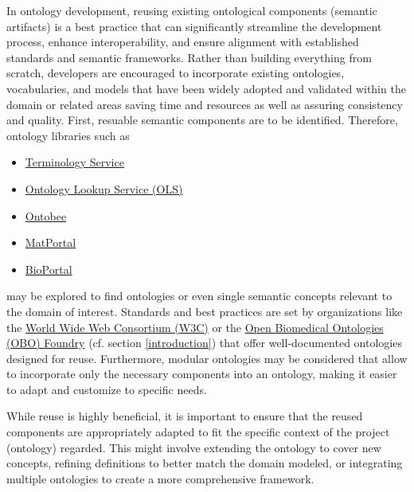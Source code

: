 In ontology development, reusing existing ontological components (semantic artifacts) is a best practice that can significantly streamline the development process, enhance interoperability, and ensure alignment with established standards and semantic frameworks. Rather than building everything from scratch, developers are encouraged to incorporate existing ontologies, vocabularies, and models that have been widely adopted and validated within the domain or related areas saving time and resources as well as assuring consistency and quality.
First, resuable semantic components are to be identified. Therefore, ontology libraries such as
\begin{itemize}
    \item \href{https://terminology.tib.eu/ts}{Terminology Service} 
    \item \href{https://www.ebi.ac.uk/ols/index}{Ontology Lookup Service (OLS)}
    \item \href{https://ontobee.org/}{Ontobee}
    \item \href{https://matportal.org/}{MatPortal}
    \item \href{https://bioportal.bioontology.org/}{BioPortal}
\end{itemize}
may be explored to find ontologies or even single semantic concepts relevant to the domain of interest. Standards and best practices are set by organizations like the \href{https://www.w3.org/}{World Wide Web Consortium (W3C)} or the \href{https://obofoundry.org/}{Open Biomedical Ontologies (OBO) Foundry} (cf. section \ref{introduction}) that offer well-documented ontologies designed for reuse. Furthermore, modular ontologies may be considered that allow to incorporate only the necessary components into an ontology, making it easier to adapt and customize to specific needs.

While reuse is highly beneficial, it is important to ensure that the reused components are appropriately adapted to fit the specific context of the project (ontology) regarded. This might involve extending the ontology to cover new concepts, refining definitions to better match the domain modeled, or integrating multiple ontologies to create a more comprehensive framework.


